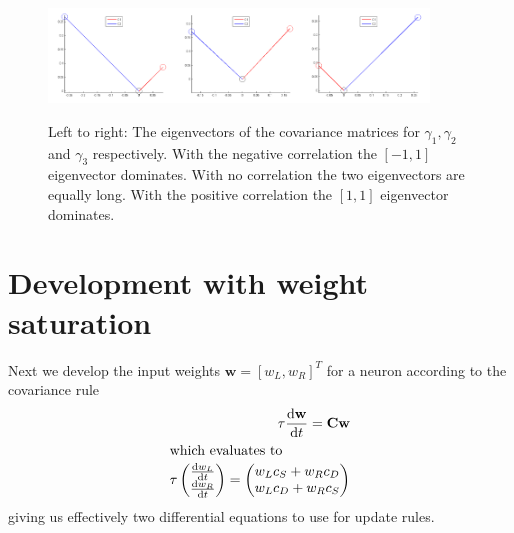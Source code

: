 \documentclass{scrartcl}
\newcommand*\diff{\mathop{}\!\mathrm{d}}
\newcommand*\colvec[3][]{
    \begin{pmatrix}\ifx\relax#1\relax\else#1\\\fi#2\\#3\end{pmatrix}
}
\begin{document}
\begin{figure}
\centering
\includegraphics[trim = {1.0cm 0 0.5cm 0.2cm}, width=0.3\textwidth, clip]{../pics/g1v}\includegraphics[trim = {1.0cm 0 0.5cm 0.2cm}, width=0.3\textwidth, clip]{../pics/g2v}\includegraphics[trim = {1.0cm 0 0.5cm 0.2cm}, width=0.3\textwidth, clip]{../pics/g3v}
\caption{Left to right: The eigenvectors of the covariance matrices for $\gamma_1, \gamma_2$ and $\gamma_3$ respectively. With the negative correlation the $[-1, 1]$ eigenvector dominates. With no correlation the two eigenvectors are equally long. With the positive correlation the $[1, 1]$ eigenvector dominates.}
\end{figure}

\section{Development with weight saturation}

Next we develop the input weights $\mathbf{w} = [w_L, w_R]^T$ for a neuron according to the covariance rule
\begin{align*}
\tau \frac{\diff \mathbf{w}}{\diff t} = \mathbf{C} \mathbf{w} \\
\shortintertext{which evaluates to}
\tau \colvec{\frac{\diff w_L}{\diff t}}{\frac{\diff w_R}{\diff t}} = \colvec{w_Lc_S + w_Rc_D}{w_Lc_D + w_Rc_S}
\end{align*}
giving us effectively two differential equations to use for update rules.
\end{document}
